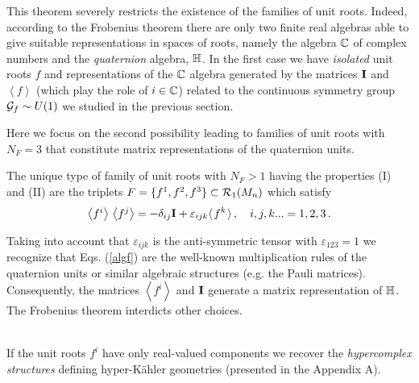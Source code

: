 \documentclass[a4paper,12pt]{article}
\begin{document}
This theorem severely restricts the  existence of the families of unit roots. 
Indeed, according to the Frobenius theorem there are only two finite real 
algebras able to give suitable representations in spaces of roots, namely the 
algebra ${\Bbb C}$ of complex numbers and the {\em quaternion} algebra, 
${\Bbb H}$. In the first case we have {\em isolated} unit roots $f$  and 
representations of the ${\Bbb C}$ algebra generated by the matrices ${\bf I}$ 
and $\left<f\right>$ (which play the role of $i\in {\Bbb C}$) related to the 
continuous symmetry  group ${\cal G}_f\sim U(1)$ we studied in the previous 
section. 

Here we focus on the second possibility leading to families of unit roots with 
$N_F=3$ that constitute matrix representations of the quaternion units. 
\begin{theor}\label{bumbum}
The unique type of family of unit roots with $N_F>1$ having the properties (I) 
and (II) are the triplets $F=\{ f^1,f^2,f^3\}\subset {\cal R}_1(M_n)$ which 
satisfy 
\begin{equation}\label{algf}
{{\textstyle  \left<f^i\right>\,\left<f^j\right>}=-\delta_{ij} {\bf  I}} +
\varepsilon_{ijk} {\textstyle  
\left< \right.} f^k {\left. \textstyle \right>}\,, 
\quad i,j,k...=1,2,3\,. 
\end{equation}
\end{theor}
\begin{demo}
Taking into account that $\varepsilon_{ijk}$ is the anti-symmetric tensor 
with $\varepsilon_{123}=1$ we recognize that Eqs. (\ref{algf}) are the 
well-known multiplication rules of the quaternion units or similar algebraic 
structures (e.g. the Pauli matrices). Consequently, the matrices  
$\left<f^i\right>$ and ${\bf I} $ generate a matrix representation of 
${\Bbb H}$. The Frobenius theorem interdicts other choices.
\end{demo}\\
If the unit roots $f^i$ have only real-valued components 
we recover the {\em hypercomplex structures} defining hyper-K\" ahler 
geometries (presented in the Appendix A). 
\end{document}
